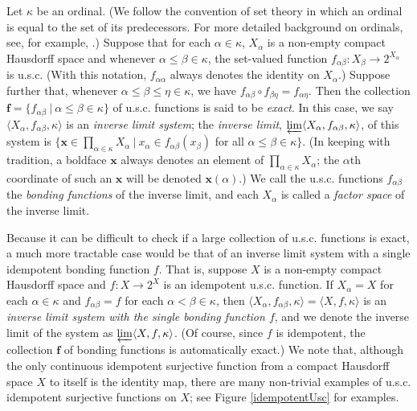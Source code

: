 \documentclass{amsart}
\theoremstyle{definition}
\newcommand{\<}{\langle}
\renewcommand{\>}{\rangle}
\begin{document}
Let $\kappa$ be an ordinal. (We follow the convention of set theory in which an ordinal is equal to the set of its predecessors. For more detailed background on ordinals, see, for example, \cite{Kunen}.) Suppose that for each $\alpha \in \kappa$, $X_{\alpha}$ is a non-empty compact Hausdorff space and whenever $\alpha \le \beta \in \kappa$, the set-valued function $f_{\alpha \beta} : X_{\beta} \rightarrow 2^{X_{\alpha}}$ is u.s.c. (With this notation, $f_{\alpha \alpha}$ always denotes the identity on $X_{\alpha}$.) Suppose further that, whenever $\alpha \le \beta \le \eta \in \kappa$, we have $f_{\alpha \beta} \circ f_{\beta \eta} = f_{\alpha \eta}$. Then the collection $\textbf{f} = \{ f_{\alpha \beta} \ | \ \alpha \le \beta \in \kappa\}$ of u.s.c. functions is said to be \emph{exact}. In this case, we say $\<X_{\alpha}, f_{\alpha \beta}, \kappa\>$ is an \emph{inverse limit system}; the \emph{inverse limit}, $\varprojlim \<X_{\alpha}, f_{\alpha \beta}, \kappa\>$, of this system is $\{ \textbf{x} \in \prod_{\alpha \in \kappa} X_{\alpha} \ | \ x_{\alpha} \in f_{\alpha \beta}(x_{\beta})$ for all $\alpha \le \beta \in \kappa\}$. (In keeping with tradition, a boldface $\textbf{x}$ always denotes an element of $\prod_{\alpha \in \kappa} X_{\alpha}$; the $\alpha$th coordinate of such an $\textbf{x}$ will be denoted $\textbf{x}(\alpha)$.)  We call the u.s.c. functions $f_{\alpha \beta}$ the \emph{bonding functions} of the inverse limit, and each $X_{\alpha}$ is called a \emph{factor space} of the inverse limit.

Because it can be difficult to check if a large collection of u.s.c. functions is exact, a much more tractable case would be that of an inverse limit system with a single idempotent bonding function $f$. That is, suppose $X$ is a non-empty compact Hausdorff space and $f: X \rightarrow 2^{X}$ is an idempotent u.s.c. function. If $X_{\alpha} = X$ for each $\alpha \in \kappa$ and $f_{\alpha \beta} = f$ for each $\alpha < \beta \in \kappa$, then $\<X_{\alpha}, f_{\alpha \beta}, \kappa\> = \<X, f, \kappa\>$ is an \emph{inverse limit system with the single bonding function $f$}, and we denote the inverse limit of the system as $\varprojlim \<X, f, \kappa\>$. (Of course, since $f$ is idempotent, the collection $\textbf{f}$ of bonding functions is automatically exact.) We note that, although the only continuous idempotent surjective function from a compact Hausdorff space $X$ to itself is the identity map, there are many non-trivial examples of u.s.c. idempotent surjective functions on $X$; see Figure \ref{idempotentUsc} for examples.
\end{document}

